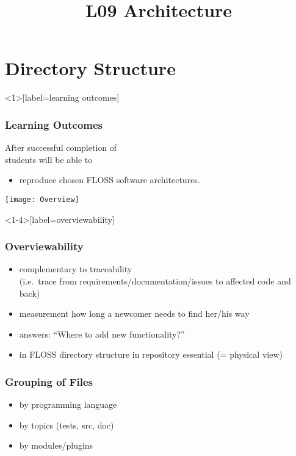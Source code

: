 

\title{L09 Architecture}




\section{Directory Structure}

\begin{frame}<1>[label=learning outcomes]
	\frametitle{Learning Outcomes}
	After successful completion of \inserttitle \\
	students will be able to

	\begin{itemize}
	\item reproduce chosen FLOSS software architectures.
	\end{itemize}
\end{frame}

\begin{frame}
	\texttt{[image: Overview]}
\end{frame}

\begin{frame}<1-4>[label=overviewability]
	\frametitle{Overviewability}

	\begin{itemize}[<+-| alert@+>]
	\item complementary to traceability \\ (i.e.\ trace from requirements/documentation/issues to affected code and back)
	\item measurement how long a newcomer needs to find her/his way
	\item answers: ``Where to add new functionality?''
	\item in FLOSS directory structure in repository essential (= physical view)
	\end{itemize}
\end{frame}

\begin{frame}
	\frametitle{Grouping of Files}

	\begin{itemize}[<+-| alert@+>]
	\item by programming language
	\item by topics (tests, src, doc)
	\item by modules/plugins
	\end{itemize}
\end{frame}

